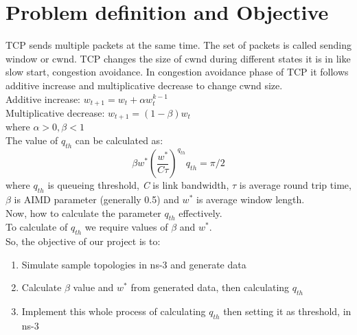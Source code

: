\clearpage
\section{Problem definition and Objective}
TCP sends multiple packets at the same time. The set of packets is called sending window or cwnd. TCP changes the size of cwnd during different states it is in like slow start, congestion avoidance. In congestion avoidance phase of TCP it follows additive increase and multiplicative decrease to change cwnd size. \\
Additive increase: \( w_{t+1} = w_{t} + \alpha w_{t}^{k-1} \)\\
Multiplicative decrease: \( w_{t+1} = (1-\beta)w_{t}  \)\\
where \( \alpha > 0, \beta < 1 \)\\
The value of \( q_{th} \) can be calculated as: \\ 
\[
    \beta w^* \left(\frac{w^*}{C \tau}\right)^{q_{th}}{q_{th}} = \pi/2
\]
where $ q_{th} $ is queueing threshold, \textit{C} is link bandwidth, $ \tau $ is average round trip time, $ \beta $ is AIMD parameter (generally 0.5) and $ w^* $ is average window length.\\
Now, how to calculate the parameter \( q_{th} \) effectively.  \\
To calculate of $ q_{th} $ we require values of $ \beta $ and $ w^* $. \\
So, the objective of our project is to: 
\begin{enumerate}
    \item Simulate sample topologies in ns-3 and generate data
    \item Calculate \( \beta \) value and $ w^* $ from generated data, then calculating \( q_{th} \) 
    \item Implement this whole process of calculating $ q_{th} $ then setting it as threshold, in ns-3 
\end{enumerate}

\clearpage


